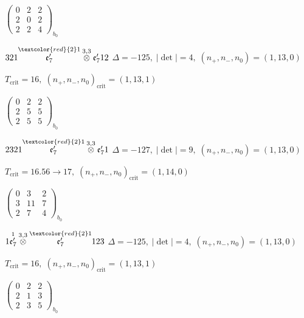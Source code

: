 \documentclass[10pt]{article}
\begin{document}
\hspace{2em}$\left(\begin{smallmatrix}0 & 2 & 2 \\ 2 & 0 & 2 \\ 2 & 2 & 4\end{smallmatrix}\right)_{\!b_0}$

$321\overset{\textcolor{red}{2}1}{\mathfrak{e}_7'}\overset{3,3}{\otimes}\mathfrak{e}_7'12$ \quad $\Delta=-125,\; |\det|=4,\; (n_+,n_-,n_0)=(1,13,0)$

\hspace{1em}$T_{\text{crit}}=16,\; (n_+,n_-,n_0)_{\text{crit}}=(1,13,1)$

\hspace{2em}$\left(\begin{smallmatrix}0 & 2 & 2 \\ 2 & 5 & 5 \\ 2 & 5 & 5\end{smallmatrix}\right)_{\!b_0}$

\smallskip

$2321\overset{\textcolor{red}{2}1}{\mathfrak{e}_7'}\overset{3,3}{\otimes}\mathfrak{e}_7'1$ \quad $\Delta=-127,\; |\det|=9,\; (n_+,n_-,n_0)=(1,13,0)$

\hspace{1em}$T_{\text{crit}}=16.56 \to 17,\; (n_+,n_-,n_0)_{\text{crit}}=(1,14,0)$

\hspace{2em}$\left(\begin{smallmatrix}0 & 3 & 2 \\ 3 & 11 & 7 \\ 2 & 7 & 4\end{smallmatrix}\right)_{\!b_0}$

\smallskip

$1\overset{1}{\mathfrak{e}_7'}\overset{3,3}{\otimes}\overset{\textcolor{red}{2}1}{\mathfrak{e}_7'}123$ \quad $\Delta=-125,\; |\det|=4,\; (n_+,n_-,n_0)=(1,13,0)$

\hspace{1em}$T_{\text{crit}}=16,\; (n_+,n_-,n_0)_{\text{crit}}=(1,13,1)$

\hspace{2em}$\left(\begin{smallmatrix}0 & 2 & 2 \\ 2 & 1 & 3 \\ 2 & 3 & 5\end{smallmatrix}\right)_{\!b_0}$
\end{document}
